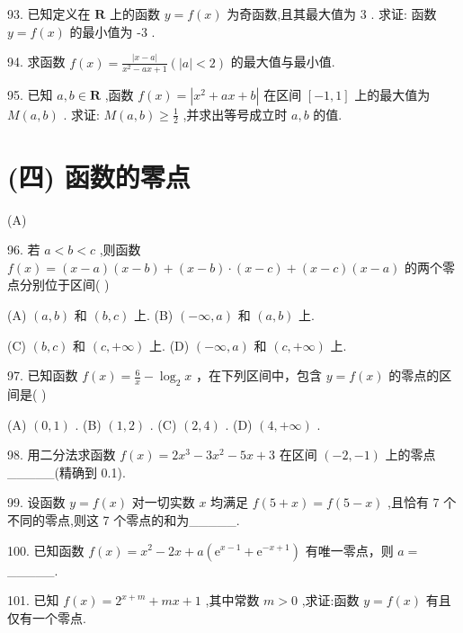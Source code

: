 \documentclass[10pt]{article}
\begin{document}
93. 已知定义在 \(\mathbf{R}\) 上的函数 \(y = f\left( x\right)\) 为奇函数,且其最大值为 3 . 求证: 函数 \(y = f\left( x\right)\) 的最小值为 -3 .

94. 求函数 \(f\left( x\right)  = \frac{\left| x - a\right| }{{x}^{2} - {ax} + 1}\left( {\left| a\right|  < 2}\right)\) 的最大值与最小值.

95. 已知 \(a,b \in  \mathbf{R}\) ,函数 \(f\left( x\right)  = \left| {{x}^{2} + {ax} + b}\right|\) 在区间 \(\left\lbrack  {-1,1}\right\rbrack\) 上的最大值为 \(M\left( {a,b}\right)\) . 求证: \(M\left( {a,b}\right)  \geq  \frac{1}{2}\) ,并求出等号成立时 \(a,b\) 的值.

\section*{(四) 函数的零点}

(A)

96. 若 \(a < b < c\) ,则函数 \(f\left( x\right)  = \left( {x - a}\right) \left( {x - b}\right)  + \left( {x - b}\right)  \cdot  \left( {x - c}\right)  + \left( {x - c}\right) \left( {x - a}\right)\) 的两个零点分别位于区间( )

(A) \(\left( {a,b}\right)\) 和 \(\left( {b,c}\right)\) 上. (B) \(\left( {-\infty ,a}\right)\) 和 \(\left( {a,b}\right)\) 上.

(C) \(\left( {b,c}\right)\) 和 \(\left( {c, + \infty }\right)\) 上. (D) \(\left( {-\infty ,a}\right)\) 和 \(\left( {c, + \infty }\right)\) 上.

97. 已知函数 \(f\left( x\right)  = \frac{6}{x} - {\log }_{2}x\) ，在下列区间中，包含 \(y = f\left( x\right)\) 的零点的区间是( )

(A) \(\left( {0,1}\right)\) . (B) \(\left( {1,2}\right)\) . (C) \(\left( {2,4}\right)\) . (D) \(\left( {4, + \infty }\right)\) .

98. 用二分法求函数 \(f\left( x\right)  = 2{x}^{3} - 3{x}^{2} - {5x} + 3\) 在区间 \(\left( {-2, - 1}\right)\) 上的零点\_\_\_\_\_(精确到 0.1).

99. 设函数 \(y = f\left( x\right)\) 对一切实数 \(x\) 均满足 \(f\left( {5 + x}\right)  = f\left( {5 - x}\right)\) ,且恰有 7 个不同的零点,则这 7 个零点的和为\_\_\_\_\_.

100. 已知函数 \(f\left( x\right)  = {x}^{2} - {2x} + a\left( {{\mathrm{e}}^{x - 1} + {\mathrm{e}}^{-x + 1}}\right)\) 有唯一零点，则 \(a =\) \_\_\_\_\_.

101. 已知 \(f\left( x\right)  = {2}^{x + m} + {mx} + 1\) ,其中常数 \(m > 0\) ,求证:函数 \(y = f\left( x\right)\) 有且仅有一个零点.
\end{document}
